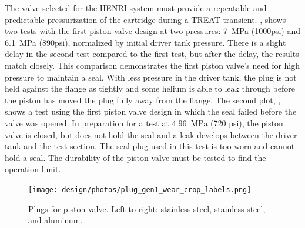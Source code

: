 The valve selected for the HENRI system must provide a repeatable and predictable pressurization of the cartridge during a TREAT transient. , shows two tests with the first piston valve design at two pressures: \SI{7}{\mega\pascal} (1000psi) and \SI{6.1}{\mega\pascal} (890psi), normalized by initial driver tank pressure. There is a slight delay in the second test compared to the first test, but after the delay, the results match closely. This comparison demonstrates the first piston valve's need for high pressure to maintain a seal. With less pressure in the driver tank, the plug is not held against the flange as tightly and some helium is able to leak through before the piston has moved the plug fully away from the flange. The second plot, , shows a test using the first piston valve design in which the seal failed before the valve was opened. In preparation for a test at \SI{4.96}{\mega\pascal} (720 psi), the piston valve is closed, but does not hold the seal and a leak develops between the driver tank and the test section. The seal plug used in this test is too worn and cannot hold a seal. The durability of the piston valve must be tested to find the operation limit.



\begin{figure}[tb]
    \vspace{16pt}
    \centering
    \texttt{[image: design/photos/plug\_gen1\_wear\_crop\_labels.png]}
    \caption{Plugs for piston valve. Left to right: stainless steel, stainless steel, and aluminum.}
    \label{fig:plug wear}
    \vspace{16pt}
\end{figure}

